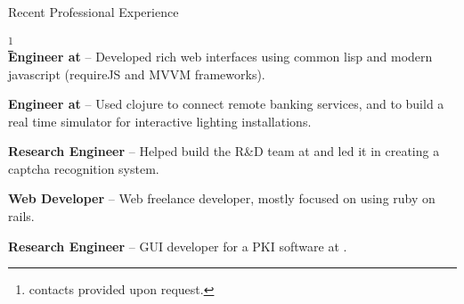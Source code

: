 \begin{rubric}{Recent Professional Experience}{ \footnote{contacts
provided upon request.}  \\

    \entry*[2013-06 - Present] \textbf{Engineer at
} --
Developed rich web interfaces using common lisp and modern javascript
(requireJS and MVVM frameworks).

    \entry*[2012 - 2013-06] \textbf{Engineer at
} --
Used clojure to connect remote banking services, and to build a real
time simulator for interactive lighting installations.

    \entry*[2010 - 2012] \textbf{Research Engineer} -- Helped build
the R\&D team at 
and led it in creating a captcha recognition system.

    \entry*[2007-2009] \textbf{Web Developer} -- Web freelance
developer, mostly focused on using ruby on rails.

    \entry*[2005 - 2007] \textbf{Research Engineer} -- GUI developer
for a PKI software at .

}
\end{rubric}

